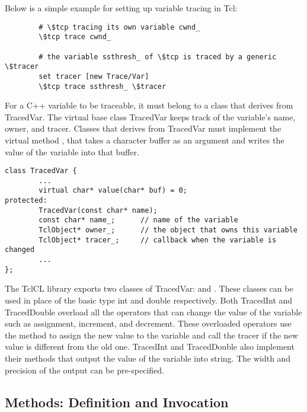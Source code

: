 Below is a simple example for setting up variable tracing in Tcl:

\begin{small}
\begin{verbatim}
        # \$tcp tracing its own variable cwnd_
        \$tcp trace cwnd_

        # the variable ssthresh_ of \$tcp is traced by a generic \$tracer
        set tracer [new Trace/Var]
        \$tcp trace ssthresh_ \$tracer
\end{verbatim}
\end{small}

For a C++ variable to be traceable, it must belong to a class that
derives from TracedVar.  The virtual base class TracedVar keeps track of
the variable's name, owner, and tracer.  Classes that derives from
TracedVar must implement the virtual method , that takes a
character buffer as an argument and writes the value of the variable
into that buffer.

\begin{small}
\begin{verbatim}
class TracedVar {
        ...
        virtual char* value(char* buf) = 0;
protected:
        TracedVar(const char* name);
        const char* name_;      // name of the variable
        TclObject* owner_;      // the object that owns this variable
        TclObject* tracer_;     // callback when the variable is changed
        ...
};
\end{verbatim}
\end{small}

The TclCL library exports two classes of TracedVar:   and
.  These classes can be used in place of the basic
type int and double respectively.  Both TracedInt and TracedDouble
overload all the operators that can change the value of the variable
such as assignment, increment, and decrement.  These overloaded
operators use the  method to assign the new value to the
variable and call the tracer if the new value is different from the old
one.  TracedInt and TracedDouble also implement their 
methods that output the value of the variable into string.  The width
and precision of the output can be pre-specified.

\subsection{ Methods: Definition and Invocation}
\label{sec:Commands}

